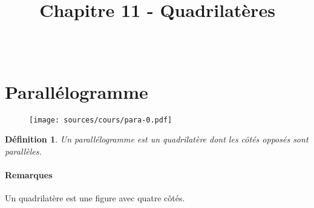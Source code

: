 \documentclass[paper=a4, fontsize=9pt]{scrartcl} %
\title{	
  \vspace{-10ex}
  \horrule{0.5pt} \\[0.4cm] %
  \huge Chapitre 11 - Quadrilatères\\ %
  \horrule{2pt} \\[0.5cm] %
}
\author{}
\date{\vspace{-10ex}} %
\begin{document}

\newtheorem{Definition}{Définition}
\newtheorem{Theorem}{Théorème}
\newtheorem{Proposition}{Propriété}

\renewcommand{\labelitemi}{$\bullet$}
\renewcommand{\labelitemii}{$\circ$}

\maketitle %

\section{Parallélogramme}

\begin{multicols}{2}
  \begin{figure}[H]
    \centering
    \texttt{[image: sources/cours/para-0.pdf]}
  \end{figure}

  \begin{Definition}
    Un parallélogramme est un quadrilatère dont les côtés opposés sont parallèles.
  \end{Definition}

  \paragraph{Remarques}
  Un quadrilatère est une figure avec quatre côtés.
\end{multicols}
\end{document}
